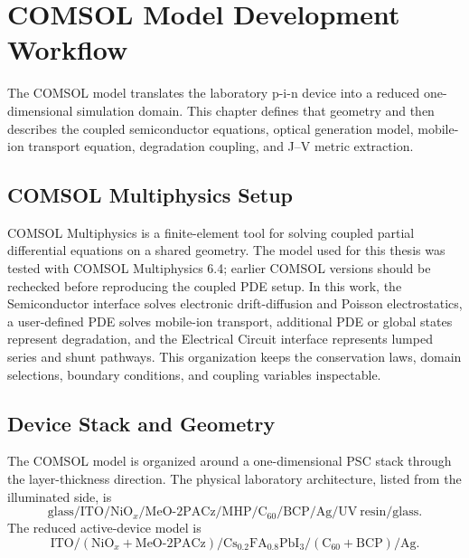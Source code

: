 \chapter{COMSOL Model Development Workflow}

The COMSOL model translates the laboratory p-i-n device into a reduced
one-dimensional simulation domain. This chapter defines that geometry and then
describes the coupled semiconductor equations, optical generation model,
mobile-ion transport equation, degradation coupling, and J--V metric
extraction.

\section{COMSOL Multiphysics Setup}

COMSOL Multiphysics is a finite-element tool for solving coupled partial
differential equations on a shared geometry. The model used for this thesis
was tested with COMSOL Multiphysics 6.4; earlier COMSOL versions should be
rechecked before reproducing the coupled PDE setup.
In this work, the Semiconductor interface solves electronic drift-diffusion and
Poisson electrostatics, a user-defined PDE solves mobile-ion transport,
additional PDE or global states represent degradation, and the Electrical
Circuit interface represents lumped series and shunt pathways. This
organization keeps the conservation laws, domain selections, boundary
conditions, and coupling variables inspectable.

\section{Device Stack and Geometry}

The COMSOL model is organized around a one-dimensional PSC stack through the
layer-thickness direction. The physical laboratory architecture, listed from
the illuminated side, is
\begin{equation}
\mathrm{glass}/\mathrm{ITO}/\mathrm{NiO}_x/
\mathrm{MeO\mbox{-}2PACz}/\mathrm{MHP}/
\mathrm{C}_{60}/\mathrm{BCP}/\mathrm{Ag}/
\mathrm{UV\ resin}/\mathrm{glass}.
\end{equation}
The reduced active-device model is
\begin{equation}
\mathrm{ITO}/(\mathrm{NiO}_x+\mathrm{MeO\mbox{-}2PACz})/
\mathrm{Cs}_{0.2}\mathrm{FA}_{0.8}\mathrm{PbI}_3/
(\mathrm{C}_{60}+\mathrm{BCP})/\mathrm{Ag}.
\end{equation}

